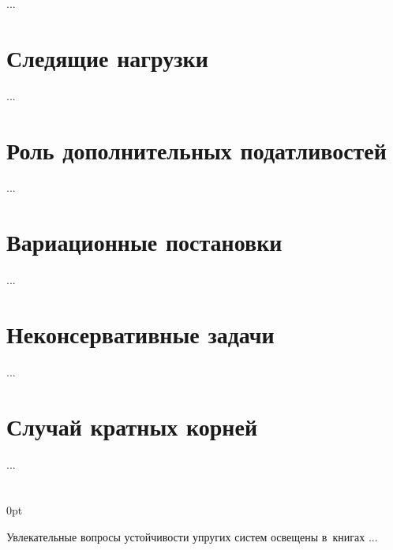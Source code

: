 \begin{otherlanguage}{russian}

...



\section{Следящие нагрузки}

...



\section{Роль дополнительных податливостей}

...



\section{Вариационные постановки}

...



\section{Неконсервативные задачи}

...



\section{Случай кратных корней}

...



\end{otherlanguage}

\section*{\small \wordforbibliography}

\begin{changemargin}{\parindent}{0pt}
\fontsize{10}{12}\selectfont

\begin{otherlanguage}{russian}

Увлекательные вопросы устойчивости упругих систем освещены в~книгах ...

\end{otherlanguage}

\end{changemargin}
